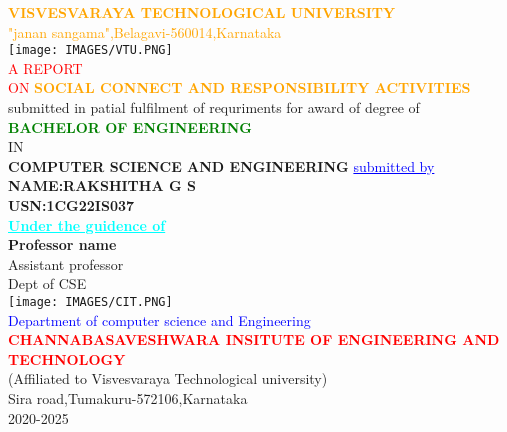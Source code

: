 \documentclass[12pt,a4paper]{article}
\begin{document}
    \begin{center}
        \textcolor{orange}{\large\textbf{VISVESVARAYA TECHNOLOGICAL UNIVERSITY}\\"janan sangama",Belagavi-560014,Karnataka}\\
        \vspace{2mm}
        \texttt{[image: IMAGES/VTU.PNG]}\\
        \vspace{2mm}
        \textcolor{red}{ A REPORT}\\
        \textcolor{red}{ON}
        \textcolor{orange}{\textbf{SOCIAL CONNECT AND RESPONSIBILITY ACTIVITIES}}\\
        \small{submitted in patial fulfilment of requriments for award of degree of}\\
        \vspace{5mm}
        \textcolor{green}{\textbf{BACHELOR OF ENGINEERING}}\\
        IN\\
        \textbf{COMPUTER SCIENCE AND ENGINEERING}
        \vspace{5mm}
        \textcolor{blue}{\underline{submitted by}}\\
        \textbf{NAME:RAKSHITHA G S}\\
        \textbf{USN:1CG22IS037}\\
        \vspace{5mm}
        \textcolor{cyan}{\underline{{\textbf{Under the guidence of}}}}\\
        \large\textbf{Professor name}\\
        Assistant professor\\
        Dept of CSE\\
        \centering\texttt{[image: IMAGES/CIT.PNG]}\\
        \textcolor{blue}{Department of computer science and Engineering}
        \textcolor{red}{\textbf{CHANNABASAVESHWARA INSITUTE OF ENGINEERING AND TECHNOLOGY}}\\
        (Affiliated to Visvesvaraya Technological university)\\
        Sira road,Tumakuru-572106,Karnataka\\
        2020-2025
    \end{center}
\end{document}
